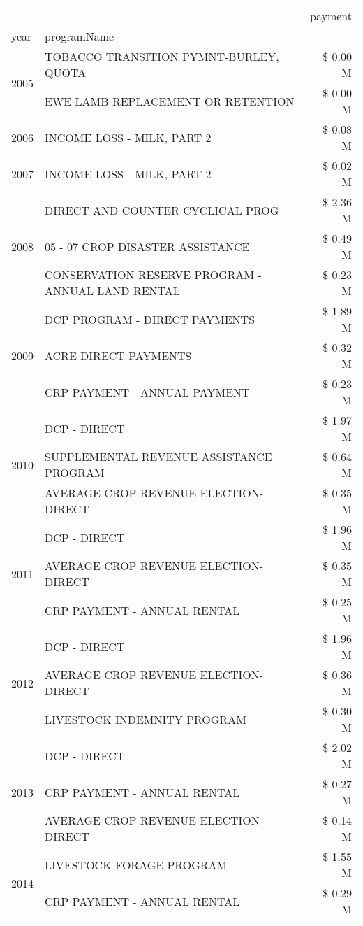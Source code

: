\begin{tabular}{llr}
\toprule
 &  & payment \\
year & programName &  \\
\midrule
\multirow[t]{2}{*}{2005} & TOBACCO TRANSITION PYMNT-BURLEY, QUOTA & \$ 0.00 M \\
 & EWE LAMB REPLACEMENT OR RETENTION & \$ 0.00 M \\
\cline{1-3}
2006 & INCOME LOSS - MILK, PART 2 & \$ 0.08 M \\
\cline{1-3}
2007 & INCOME LOSS - MILK, PART 2 & \$ 0.02 M \\
\cline{1-3}
\multirow[t]{3}{*}{2008} & DIRECT AND COUNTER CYCLICAL PROG & \$ 2.36 M \\
 & 05 - 07 CROP DISASTER ASSISTANCE & \$ 0.49 M \\
 & CONSERVATION RESERVE PROGRAM - ANNUAL LAND RENTAL & \$ 0.23 M \\
\cline{1-3}
\multirow[t]{3}{*}{2009} & DCP PROGRAM - DIRECT PAYMENTS & \$ 1.89 M \\
 & ACRE DIRECT PAYMENTS & \$ 0.32 M \\
 & CRP PAYMENT - ANNUAL PAYMENT & \$ 0.23 M \\
\cline{1-3}
\multirow[t]{3}{*}{2010} & DCP - DIRECT & \$ 1.97 M \\
 & SUPPLEMENTAL REVENUE ASSISTANCE PROGRAM & \$ 0.64 M \\
 & AVERAGE CROP REVENUE ELECTION-DIRECT & \$ 0.35 M \\
\cline{1-3}
\multirow[t]{3}{*}{2011} & DCP - DIRECT & \$ 1.96 M \\
 & AVERAGE CROP REVENUE ELECTION-DIRECT & \$ 0.35 M \\
 & CRP PAYMENT - ANNUAL RENTAL & \$ 0.25 M \\
\cline{1-3}
\multirow[t]{3}{*}{2012} & DCP - DIRECT & \$ 1.96 M \\
 & AVERAGE CROP REVENUE ELECTION-DIRECT & \$ 0.36 M \\
 & LIVESTOCK INDEMNITY PROGRAM & \$ 0.30 M \\
\cline{1-3}
\multirow[t]{3}{*}{2013} & DCP - DIRECT & \$ 2.02 M \\
 & CRP PAYMENT - ANNUAL RENTAL & \$ 0.27 M \\
 & AVERAGE CROP REVENUE ELECTION-DIRECT & \$ 0.14 M \\
\cline{1-3}
\multirow[t]{3}{*}{2014} & LIVESTOCK FORAGE PROGRAM & \$ 1.55 M \\
 & CRP PAYMENT - ANNUAL RENTAL & \$ 0.29 M \\

\end{tabular}
